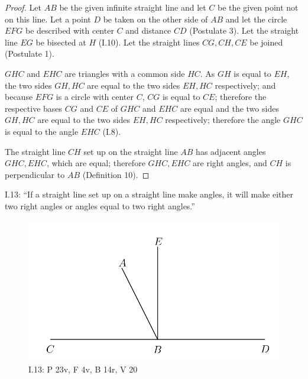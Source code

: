 \documentclass{article}
\begin{document}
\begin{proof}
Let $AB$ be the given infinite straight line and let $C$ be the given point not on this line.
Let a point $D$ be taken on the other side of $AB$ and let the circle $EFG$ be described with center $C$ and
distance $CD$ (Postulate 3).
Let the straight line $EG$ be bisected at $H$ (I.10).
Let the straight lines $CG, CH, CE$ be joined (Postulate 1).

$GHC$ and $EHC$ are triangles with a common side $HC$. 
As $GH$ is equal to $EH$, the two sides $GH,HC$ are equal to the two sides
$EH,HC$ respectively;
and because $EFG$ is a circle with center $C$,
$CG$ is equal to $CE$;
therefore the respective bases $CG$ and $CE$ of $GHC$ and $EHC$ are equal and the two
sides $GH,HC$ are equal to the two sides $EH,HC$ respectively;
therefore the angle $GHC$ is equal to the angle $EHC$ (I.8).

The straight line $CH$ set up on the straight line $AB$ has adjacent angles $GHC,EHC$, which are equal; therefore
$GHC,EHC$ are right angles, and $CH$ is perpendicular to $AB$ (Definition 10).
\end{proof}

I.13: ``If a straight line set up on a straight line make angles, it
will make either two right angles or angles equal to two right
angles.''

\begin{figure}
\begin{center}
\includegraphics[width=\textwidth]{I13.png}
\end{center}
\caption{I.13: P 23v, F 4v, B 14r, V 20}
\label{I13}
\end{figure}
\end{document}
